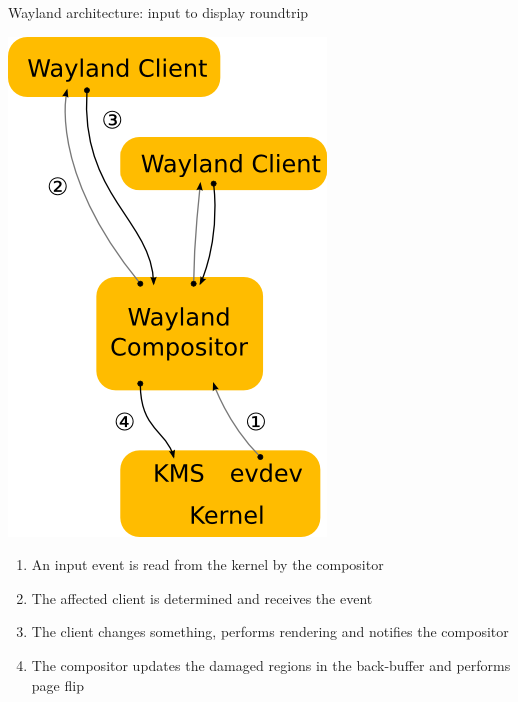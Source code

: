\begin{frame}{Wayland architecture: input to display roundtrip}
  \begin{minipage}{0.49\textwidth}
    \centering
    \includegraphics[height=0.7\textheight]{slides/graphics-software/wayland-architecture-roundtrip.png}
  \end{minipage}
  \hfill
  \begin{minipage}{0.49\textwidth}
    \begin{enumerate}
    \item An input event is read from the kernel by the compositor
    \item The affected client is determined and receives the event
    \item The client changes something, performs rendering and notifies the compositor
    \item The compositor updates the damaged regions in the back-buffer and performs page flip
    \end{enumerate}
  \end{minipage}
\end{frame}

